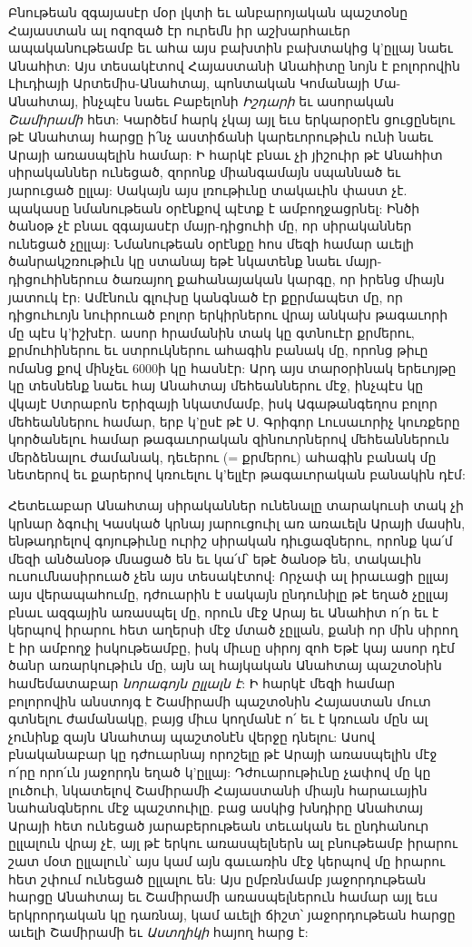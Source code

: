 \documentclass{article}
\begin{document}
{Բնութեան զգայասէր մօր լկտի եւ անբարոյական պաշտօնը Հայաստան ալ ոզոզած էր ուրեմն իր աշխարհաւեր ապականութեամբ եւ ահա այս բախտին բախտակից կ'ըլլայ նաեւ Անահիտ: Այս տեսակէտով Հայաստանի Անահիտը նոյն է բոլորովին Լիւդիայի Արտեմիս-Անահտայ, պոնտական Կոմանայի Մա-Անահտայ, ինչպէս նաեւ Բաբելոնի \emph{Իշդարի} եւ ասորական \emph{Շամիրամի} հետ: Կարծեմ հարկ չկայ այլ եւս երկարօրէն ցուցընելու թէ Անահտայ հարցը ի՛նչ աստիճանի կարեւորութիւն ունի նաեւ Արայի առասպելին համար: Ի հարկէ բնաւ չի յիշուիր թէ Անահիտ սիրականներ ունեցած, զորոնք միանգամայն սպաննած եւ յարուցած ըլլայ: Սակայն այս լռութիւնը տակաւին փաստ չէ. պակասը նմանութեան օրէնքով պէտք է ամբողջացրնել: Ինծի ծանօթ չէ բնաւ զգայասէր մայր-դիցուհի մը, որ սիրականներ ունեցած չըլլայ: Նմանութեան օրէնքը հոս մեզի համար աւելի ծանրակշռութիւն կը ստանայ եթէ նկատենք նաեւ մայր-դիցուհիներուս ծառայող քահանայական կարգը, որ իրենց միայն յատուկ էր: Ամէնուն գլուխը կանգնած էր քըրմապետ մը, որ դիցուհւոյն նուիրուած բոլոր երկիրներու վրայ անկախ թագաւորի մը պէս կ'իշխէր. ասոր հրամանին տակ կը գտնուէր քրմերու, քրմուհիներու եւ ստրուկներու ահագին բանակ մը, որոնց թիւը ոմանց քով մինչեւ 6000ի կը հասնէր: Արդ այս տարօրինակ երեւոյթը կը տեսնենք նաեւ հայ Անահտայ մեհեաններու մէջ, ինչպէս կը վկայէ Ստրաբոն Երիզայի նկատմամբ, իսկ Ագաթանգեղոս բոլոր մեհեաններու համար, երբ կ'ըսէ թէ Ս. Գրիգոր Լուսաւորիչ կուռքերը կործանելու համար թագաւորական զինուորներով մեհեաններուն մերձենալու ժամանակ, դեւերու (= քրմերու) ահագին բանակ մը նետերով եւ քարերով կռուելու կ'ելլէր թագաւորական բանակին դէմ:

Հետեւաբար Անահտայ սիրականներ ունենալը տարակուսի տակ չի կրնար ձգուիլ Կասկած կրնայ յարուցուիլ առ առաւելն Արայի մասին, ենթադրելով գոյութիւնը ուրիշ սիրական դիւցազներու, որոնք կա՛մ մեզի անծանօթ մնացած են եւ կա՛մ՝ եթէ ծանօթ են, տակաւին ուսումնասիրուած չեն այս տեսակէտով: Որչափ ալ իրաւացի ըլլայ այս վերապահումը, դժուարին է սակայն ընդունիլը թէ եղած չըլլայ բնաւ ազգային առասպել մը, որուն մէջ Արայ եւ Անահիտ ո՛ր եւ է կերպով իրարու հետ աղերսի մէջ մտած չըլլան, քանի որ մին սիրող է իր ամբողջ իսկութեամբը, իսկ միւսը սիրոյ զոհ Եթէ կայ ասոր դէմ ծանր առարկութիւն մը, այն ալ հայկական Անահտայ պաշտօնին համեմատաբար \emph{նորագոյն ըլլալն է}: Ի հարկէ մեզի համար բոլորովին անստոյգ է Շամիրամի պաշտօնին Հայաստան մուտ գտնելու ժամանակը, բայց միւս կողմանէ ո՛ եւ է կռուան մըն ալ չունինք զայն Անահտայ պաշտօնէն վերջը դնելու: Ասով բնականաբար կը դժուարնայ որոշելը թէ Արայի առասպելին մէջ ո՛րը որո՛ւն յաջորդն եղած կ'ըլլայ: Դժուարութիւնը չափով մը կը լուծուի, նկատելով Շամիրամի Հայաստանի միայն հարաւային նահանգներու մէջ պաշտուիլը. բաց ասկից խնդիրը Անահտայ Արայի հետ ունեցած յարաբերութեան տեւական եւ ընդհանուր ըլլալուն վրայ չէ, այլ թէ երկու առասպելներն ալ բնութեամբ իրարու շատ մօտ ըլլալուն՝ այս կամ այն գաւառին մէջ կերպով մը իրարու հետ շփում ունեցած ըլլալու են: Այս ըմբռնմամբ յաջորդութեան հարցը Անահտայ եւ Շամիրամի առասպելներուն համար այլ եւս երկրորդական կը դառնայ, կամ աւելի ճիշտ՝ յաջորդութեան հարցը աւելի Շամիրամի եւ \emph{Աստղիկի} հայող հարց է:

}
\end{document}
